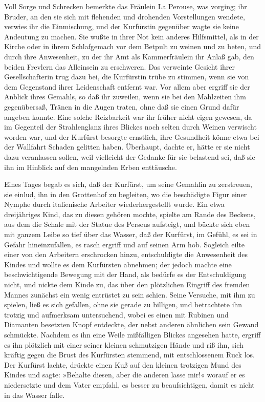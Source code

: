 Voll Sorge und Schrecken bemerkte das Fräulein La Perouse, was
vorging; ihr Bruder, an den sie sich mit flehenden und drohenden
Vorstellungen wendete, verwies ihr die Einmischung, und der
Kurfürstin gegenüber wagte sie keine Andeutung zu machen. Sie wußte
in ihrer Not kein anderes Hilfsmittel, als in der Kirche oder in
ihrem \pagenum{[117]} Schlafgemach vor dem Betpult zu weinen und zu
beten, und durch ihre Anwesenheit, zu der ihr Amt als
Kammerfräulein ihr Anlaß gab, den beiden Frevlern das Alleinsein zu
erschweren. Das verweinte Gesicht ihrer Gesellschafterin trug dazu
bei, die Kurfürstin trübe zu stimmen, wenn sie von dem Gegenstand
ihrer Leidenschaft entfernt war. Vor allem aber ergriff sie der
Anblick ihres Gemahls, so daß ihr zuweilen, wenn sie bei den
Mahlzeiten ihm gegenübersaß, Tränen in die Augen traten, ohne daß
sie einen Grund dafür angeben konnte. Eine solche Reizbarkeit war
ihr früher nicht eigen gewesen, da im Gegenteil der Strahlenglanz
ihres Blickes noch selten durch Weinen verwischt worden war, und
der Kurfürst besorgte ernstlich, ihre Gesundheit könne etwa bei der
Wallfahrt Schaden gelitten haben. Überhaupt, dachte er, hätte er
sie nicht dazu veranlassen sollen, weil vielleicht der Gedanke für
sie belastend sei, daß sie ihn im Hinblick auf den mangelnden Erben
enttäusche.

Eines Tages begab es sich, daß der Kurfürst, um seine Gemahlin zu
zerstreuen, sie einlud, ihn in den Grottenhof zu begleiten, wo die
beschädigte Figur einer Nymphe durch italienische Arbeiter
wiederhergestellt wurde. Ein etwa dreijähriges Kind, das zu diesen
gehören mochte, spielte am Rande des Beckens, aus dem die Schale
mit der Statue des Perseus aufsteigt, und bückte sich eben mit
ganzem Leibe so tief über das Wasser, daß der Kurfürst, im Gefühl,
es sei in Gefahr hineinzufallen, es rasch ergriff und auf seinen
Arm hob. Sogleich eilte einer von den Arbeitern erschrocken hinzu,
entschuldigte die Anwesenheit des Kindes und wollte es dem
Kurfürsten abnehmen; der jedoch machte eine beschwichtigende
Bewegung mit der Hand, als bedürfe es der \pagenum{[118]}
Entschuldigung nicht, und nickte dem Kinde zu, das über den
plötzlichen Eingriff des fremden Mannes zunächst ein wenig
entrüstet zu sein schien. Seine Versuche, mit ihm zu spielen, ließ
es sich gefallen, ohne sie gerade zu billigen, und betrachtete ihn
trotzig und aufmerksam untersuchend, wobei es einen mit Rubinen und
Diamanten besetzten Knopf entdeckte, der nebst anderen ähnlichen
sein Gewand schmückte. Nachdem es ihn eine Weile mißfälligen
Blickes angesehen hatte, ergriff es ihn plötzlich mit einer seiner
kleinen schmutzigen Hände und riß ihn, sich kräftig gegen die Brust
des Kurfürsten stemmend, mit entschlossenem Ruck los. Der Kurfürst
lachte, drückte einen Kuß auf den kleinen trotzigen Mund des Kindes
und sagte: »Behalte diesen, aber die anderen lasse mir!« worauf er
es niedersetzte und dem Vater empfahl, es besser zu beaufsichtigen,
damit es nicht in das Wasser falle.

